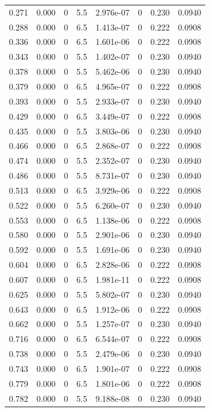 \documentclass[preview]{standalone}
\begin{document}
{{\begin{tabular}{L{1.2cm}C{1.2cm} C{0.3cm}C{0.5cm} C{1.4cm}C{1.4cm} C{1.4cm}C{1.4cm}}
  0.271  &  0.000  & 0     & 5.5 &  2.976e-07  & 0  & 0.230 &  0.0940   \\ 
  0.288  &  0.000  & 0     & 6.5 &  1.413e-07  & 0  & 0.222 &  0.0908   \\ 
  0.336  &  0.000  & 0     & 6.5 &  1.601e-06  & 0  & 0.222 &  0.0908   \\ 
  0.343  &  0.000  & 0     & 5.5 &  1.402e-07  & 0  & 0.230 &  0.0940   \\ 
  0.378  &  0.000  & 0     & 5.5 &  5.462e-06  & 0  & 0.230 &  0.0940   \\ 
  0.379  &  0.000  & 0     & 6.5 &  4.965e-07  & 0  & 0.222 &  0.0908   \\ 
  0.393  &  0.000  & 0     & 5.5 &  2.933e-07  & 0  & 0.230 &  0.0940   \\ 
  0.429  &  0.000  & 0     & 6.5 &  3.449e-07  & 0  & 0.222 &  0.0908   \\ 
  0.435  &  0.000  & 0     & 5.5 &  3.803e-06  & 0  & 0.230 &  0.0940   \\ 
  0.466  &  0.000  & 0     & 6.5 &  2.868e-07  & 0  & 0.222 &  0.0908   \\ 
  0.474  &  0.000  & 0     & 5.5 &  2.352e-07  & 0  & 0.230 &  0.0940   \\ 
  0.486  &  0.000  & 0     & 5.5 &  8.731e-07  & 0  & 0.230 &  0.0940   \\ 
  0.513  &  0.000  & 0     & 6.5 &  3.929e-06  & 0  & 0.222 &  0.0908   \\ 
  0.522  &  0.000  & 0     & 5.5 &  6.260e-07  & 0  & 0.230 &  0.0940   \\ 
  0.553  &  0.000  & 0     & 6.5 &  1.138e-06  & 0  & 0.222 &  0.0908   \\ 
  0.580  &  0.000  & 0     & 5.5 &  2.901e-06  & 0  & 0.230 &  0.0940   \\ 
  0.592  &  0.000  & 0     & 5.5 &  1.691e-06  & 0  & 0.230 &  0.0940   \\ 
  0.604  &  0.000  & 0     & 6.5 &  2.828e-06  & 0  & 0.222 &  0.0908   \\ 
  0.607  &  0.000  & 0     & 6.5 &  1.981e-11  & 0  & 0.222 &  0.0908   \\ 
  0.625  &  0.000  & 0     & 5.5 &  5.802e-07  & 0  & 0.230 &  0.0940   \\ 
  0.643  &  0.000  & 0     & 6.5 &  1.912e-06  & 0  & 0.222 &  0.0908   \\ 
  0.662  &  0.000  & 0     & 5.5 &  1.257e-07  & 0  & 0.230 &  0.0940   \\ 
  0.716  &  0.000  & 0     & 6.5 &  6.544e-07  & 0  & 0.222 &  0.0908   \\ 
  0.738  &  0.000  & 0     & 5.5 &  2.479e-06  & 0  & 0.230 &  0.0940   \\ 
  0.743  &  0.000  & 0     & 6.5 &  1.901e-07  & 0  & 0.222 &  0.0908   \\ 
  0.779  &  0.000  & 0     & 6.5 &  1.801e-06  & 0  & 0.222 &  0.0908   \\ 
  0.782  &  0.000  & 0     & 5.5 &  9.188e-08  & 0  & 0.230 &  0.0940   \\ 
\hline 
\end{tabular} 

}}
\end{document}
